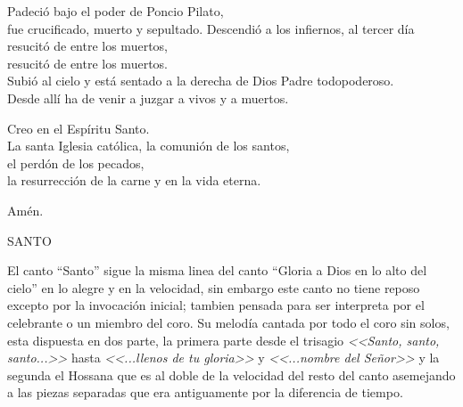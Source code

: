 \documentclass[12pt, letterpaper]{report}
\begin{document}
    \noindent
    Padeci\'o bajo el poder de Poncio Pilato,\\
    fue crucificado, muerto y sepultado. Descendi\'o a los infiernos, al tercer d\'ia resucit\'o de entre los muertos,\\
    resucit\'o de entre los muertos.\\
    Subi\'o al cielo y est\'a sentado a la derecha de Dios Padre todopoderoso.\\
    Desde all\'i ha de venir a juzgar a vivos y a muertos.

    \noindent
    Creo en el Esp\'iritu Santo.\\
    La santa Iglesia cat\'olica, la comuni\'on de los santos,\\
    el perd\'on de los pecados,\\
    la resurrecci\'on de la carne y en la vida eterna.

    \noindent
    Am\'en.
    \clearpage




    \begin{center}
      {\large SANTO}
    \end{center}

    El canto ``Santo'' sigue la misma linea del canto ``Gloria a Dios en lo alto del cielo'' en lo alegre y en la velocidad, sin embargo este canto no tiene reposo excepto por la invocaci\'on inicial; tambien pensada para ser interpreta por el celebrante o un miembro del coro. Su melod\'ia cantada por todo el coro sin solos, esta dispuesta en dos parte, la primera parte desde el trisagio \textit{<<Santo, santo, santo...>>} hasta \textit{<<...llenos de tu gloria>>} y \textit{<<...nombre del Se\~nor>>} y la segunda el Hossana que es al doble de la velocidad del resto del canto asemejando a las piezas separadas que era antiguamente por la diferencia de tiempo.
\end{document}
